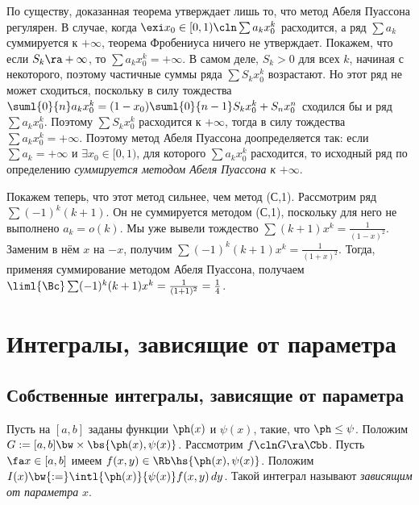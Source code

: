 \documentclass[a4paper]{article}
\begin{document}
\begin{note}
По существу, доказанная теорема утверждает лишь то, что метод Абеля Пуассона регулярен.
В случае, когда $\exi x_0 \in [0,1)\cln \sum a_kx_0^k$ расходится, а ряд $\sum a_k$ суммируется к $+\infty$,
теорема Фробениуса ничего не утверждает. Покажем, что если $S_k \ra +\infty$, то $\sum a_kx_0^k = +\infty$.
В самом деле, $S_k>0$ для всех $k$, начиная с некоторого, поэтому частичные суммы ряда $\sum S_kx_0^k$
возрастают. Но этот ряд не может сходиться, поскольку в силу тождества
$\suml{0}{n} a_kx_0^k=(1-x_0)\suml{0}{n-1}S_kx_0^k + S_nx_0^n$ сходился бы и ряд $\sum a_k x_0^k$. Поэтому
$\sum S_k x_0^k$ расходится к $+\infty$, тогда в силу тождества $\sum a_k x^k_0 = +\infty$. Поэтому
метод Абеля Пуассона доопределяется так: если $\sum a_k = +\infty$ и $\exi x_0 \in [0,1)$,
для которого $\sum a_k x_0^k$ расходится, то исходный ряд по определению
\emph{суммируется методом Абеля Пуассона к} $+\infty$.
\end{note}

Покажем теперь, что этот метод сильнее, чем метод (С,1). Рассмотрим ряд $\sum (-1)^k(k+1)$.
Он не суммируется методом (С,1), поскольку для него не выполнено $a_k=o(k)$. Мы уже вывели
тождество $\sum (k+1)x^k = \frac{1}{(1-x)^2}$. Заменим в нём $x$ на $-x$,
получим $\sum (-1)^k(k+1)x^k=\frac{1}{(1+x)^2}$. Тогда, применяя суммирование методом Абеля Пуассона, получаем
$\liml{\Bc} \sum (-1)^k(k+1)x^k=\frac{1}{(1+1)^2}= \frac{1}{4}$.

\section{Интегралы, зависящие от параметра}

\subsection{Собственные интегралы, зависящие от параметра}

\begin{df}
Пусть на $[a,b]$ заданы функции $\ph(x)$ и $\psi(x)$, такие, что $\ph \le \psi$. Положим $G :=
[a,b]\bw\times\bs{\ph(x),\psi(x)}$. Рассмотрим $f\cln G \ra \Cbb$. Пусть $\fa x \in [a,b]$ имеем $f(x,y)
\in\Rb\hs{\ph(x), \psi(x)}$. Положим $I(x) \bw{:=} \intl{\ph(x)}{\psi(x)}f(x,y)\,d y$. Такой интеграл
называют \emph{зависящим от параметра} $x$.
\end{df}
\end{document}
